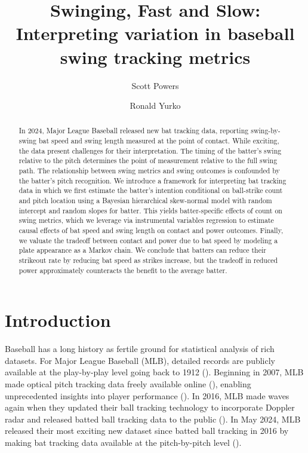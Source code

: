 \documentclass{article}
\title{Swinging, Fast and Slow:\\Interpreting variation in baseball swing tracking metrics}
\author[1]{Scott Powers}
\author[2]{Ronald Yurko}
\affil[1]{Department of Sport Management, Rice University}
\affil[2]{Department of Statistics \& Data Science, Carnegie Mellon University}
\begin{document}
  \maketitle
	
  \begin{abstract}
    In 2024, Major League Baseball released new bat tracking data, reporting swing-by-swing bat speed and swing length measured at the point of contact. While exciting, the data present challenges for their interpretation. The timing of the batter's swing relative to the pitch determines the point of measurement relative to the full swing path. The relationship between swing metrics and swing outcomes is confounded by the batter's pitch recognition. We introduce a framework for interpreting bat tracking data in which we first estimate the batter's intention conditional on ball-strike count and pitch location using a Bayesian hierarchical skew-normal model with random intercept and random slopes for batter. This yields batter-specific effects of count on swing metrics, which we leverage via instrumental variables regression to estimate causal effects of bat speed and swing length on contact and power outcomes. Finally, we valuate the tradeoff between contact and power due to bat speed by modeling a plate appearance as a Markov chain. We conclude that batters can reduce their strikeout rate by reducing bat speed as strikes increase, but the tradeoff in reduced power approximately counteracts the benefit to the average batter.
  \end{abstract}

  \section{Introduction}
  \label{sec:introduction}

    Baseball has a long history as fertile ground for statistical analysis of rich datasets. For Major League Baseball (MLB), detailed records are publicly available at the play-by-play level going back to 1912 (\cite{retrosheet_retrosheet_2025}). Beginning in 2007, MLB made optical pitch tracking data freely available online
    (\cite{fast_what_2010}), enabling unprecedented insights into player performance (\cite{swartz_quality_2017}). In 2016, MLB made waves again when they updated their ball tracking technology to incorporate Doppler radar and released batted ball tracking data to the public (\cite{arthur_new_2016}). In May 2024, MLB released their most exciting new dataset since batted ball tracking in 2016 by making bat tracking data available at the pitch-by-pitch level (\cite{petriello_everything_2024}).
\end{document}
